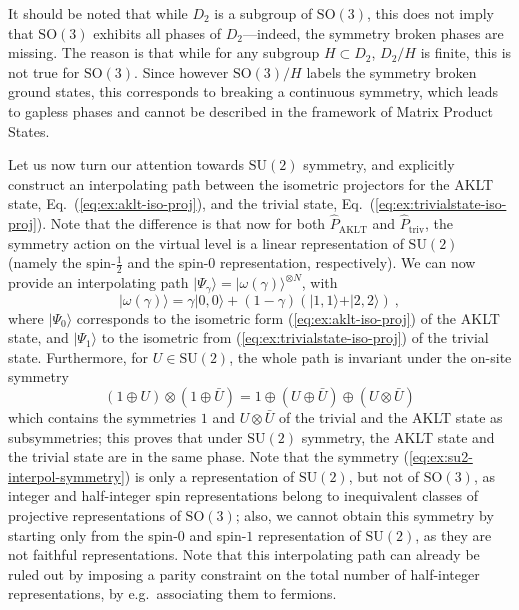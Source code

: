 \documentclass[twocolumn,superscriptaddress,prb,linenumbers]{revtex4-1}
\newcommand{\ket}[1]{\vert#1\rangle}
\begin{document}
It should be noted that while $D_2$ is a subgroup of
$\mathrm{SO}(3)$, this does not imply that $\mathrm{SO}(3)$ exhibits all
phases of $D_2$---indeed, the symmetry broken phases are missing. The
reason is that while for any subgroup $H\subset D_2$, $D_2/H$ is finite,
this is not true for $\mathrm{SO}(3)$. Since however
$\mathrm{SO}(3)/H$ labels the symmetry broken ground states, this
corresponds to breaking a continuous symmetry, which leads to gapless
phases and cannot be described in the framework of Matrix Product States.




Let us now turn our attention towards $\mathrm{SU}(2)$ symmetry, and
explicitly construct an interpolating path between the isometric
projectors for the AKLT state, Eq.~(\ref{eq:ex:aklt-iso-proj}), and the
trivial state, Eq.~(\ref{eq:ex:trivialstate-iso-proj}). Note that the
difference is that now for both $\hat P_\mathrm{AKLT}$ and $\hat
    P_\mathrm{triv}$, the symmetry action on the virtual level is a linear
representation of $\mathrm{SU}(2)$ (namely the spin-$\tfrac12$ and the
spin-$0$ representation, respectively). We can now provide an
interpolating path $\ket{\Psi_\gamma}=\ket{\omega(\gamma)}^{\otimes N}$,
with
\[
    \ket{\omega(\gamma)} = \gamma \ket{0,0} + (1-\gamma)
    (\ket{1,1}+\ket{2,2})\ ,
\]
where $\ket{\Psi_0}$ corresponds to the isometric form
(\ref{eq:ex:aklt-iso-proj}) of the AKLT state, and $\ket{\Psi_1}$ to the
isometric from (\ref{eq:ex:trivialstate-iso-proj}) of the trivial state.
Furthermore, for $U\in \mathrm{SU}(2)$, the whole path is invariant under
the on-site symmetry
\begin{equation}
    \label{eq:ex:su2-interpol-symmetry}
    (1\oplus U)\otimes (1\oplus \bar U)
    = 1\oplus (U\oplus \bar U)\oplus (U\otimes \bar U)
\end{equation}
which contains the symmetries $1$ and $U\otimes \bar U$ of the trivial and
the AKLT state as subsymmetries; this proves that under
$\mathrm{SU}(2)$ symmetry, the AKLT state and the trivial state are in
the same phase.  Note that the symmetry
(\ref{eq:ex:su2-interpol-symmetry}) is only a representation of
$\mathrm{SU}(2)$, but not of $\mathrm{SO(3)}$, as integer and half-integer
spin representations belong to inequivalent classes of projective
representations of $\mathrm{SO}(3)$; also, we cannot obtain this
symmetry by starting only from the spin-$0$ and spin-$1$ representation of
$\mathrm{SU}(2)$, as they are not faithful representations.
Note that this interpolating
path can already be ruled out by imposing a parity constraint on the total
number of half-integer representations, by e.g.\ associating them to
fermions.
\end{document}
